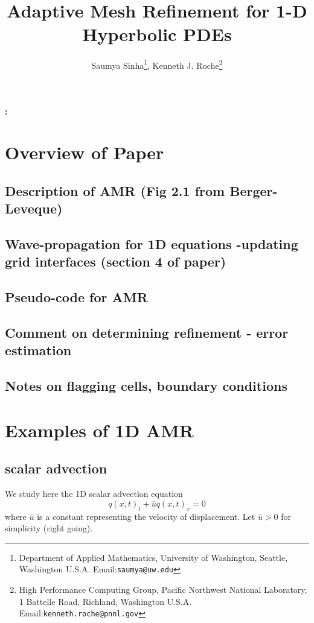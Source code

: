 \documentclass[12pt]{article}
\begin{document}
\title{\bf Adaptive Mesh Refinement for 1-D Hyperbolic PDEs}
\author{ 
Saumya Sinha\footnote{Department of Applied Mathematics, University of Washington, Seattle, Washington
U.S.A.
Email:\texttt{saumya@uw.edu}},
Kenneth J. Roche\footnote{
High Performance Computing Group, 
Pacific Northwest National Laboratory,
1 Battelle Road,
Richland, Washington 
U.S.A. 
Email:\texttt{kenneth.roche@pnnl.gov}} 
}
\maketitle


{\bf \abstractname{:}} {\small}

\newpage
\tableofcontents
\listoffigures
\listoftables
\newpage

\section{Overview of Paper}
\subsection{Description of AMR (Fig 2.1 from Berger-Leveque)}
\subsection{Wave-propagation for 1D equations -updating grid interfaces (section 4 of paper)}
\subsection{Pseudo-code for AMR}
\subsection{Comment on determining refinement - error estimation}
\subsection{Notes on flagging cells, boundary conditions}

\section{Examples of 1D AMR}
\subsection{scalar advection}
We study here the 1D scalar advection equation
\begin{equation}
q(x,t)_{t} + \bar{u} q(x,t)_{x}=0
\end{equation}
where $\bar{u}$ is a constant representing the velocity of displacement. Let $\bar{u}>0$ for simplicity (right going).
\end{document}
